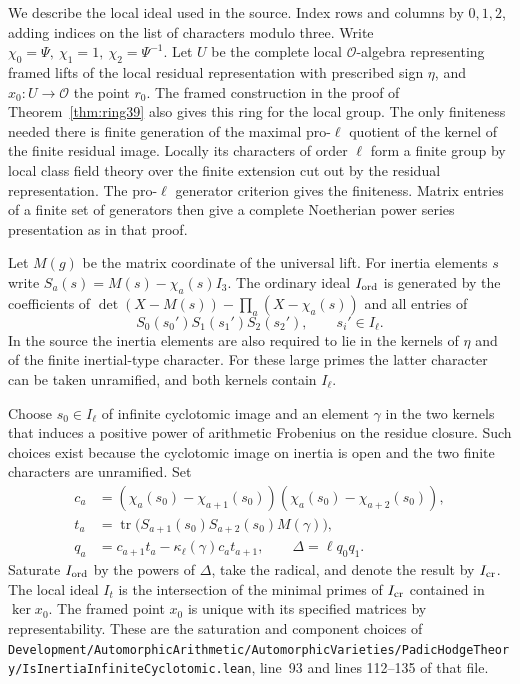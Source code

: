 \documentclass[a4paper,11pt]{article}
\theoremstyle{definition}
\theoremstyle{remark}
\newcommand{\srcloc}[2]{{\small\nolinkurl{#1.lean}}, line~#2}
\numberwithin{equation}{section}
\newcommand{\OO}{\mathcal O}
\begin{document}
We describe the local ideal used in the source. Index rows and columns
by \(0,1,2\), adding indices on the list of characters modulo three.
Write \(\chi_0=\Psi,\ \chi_1=1,\ \chi_2=\Psi^{-1}\).
Let \(U\) be the complete local \(\OO\)-algebra representing framed
lifts of the local residual representation with prescribed sign
\(\eta\), and \(x_0:U\to\OO\) the point \(r_0\).
The framed construction in the proof of Theorem~\ref{thm:ring39}
also gives this ring for the local group. The only finiteness
needed there is finite generation of the maximal pro-\(\ell\)
quotient of the kernel of the finite residual image. Locally its
characters of order \(\ell\) form a finite group by local class
field theory over the finite extension cut out by the residual
representation. The pro-\(\ell\) generator criterion gives the
finiteness. Matrix entries of a finite set of generators then
give a complete Noetherian power series presentation as in that proof.

Let \(M(g)\) be the matrix coordinate of the universal lift. For
inertia elements \(s\) write
\(S_a(s)=M(s)-\chi_a(s)I_3\). The ordinary ideal \(I_{\rm ord}\)
is generated by the coefficients of
\(\det(X-M(s))-\prod_a(X-\chi_a(s))\) and all entries of
\begin{equation}
       S_0(s_0')S_1(s_1')S_2(s_2'),\qquad s_i'\in I_\ell .
                                                        \label{eq:word68}
\end{equation}
In the source the inertia elements are also required to lie in the
kernels of \(\eta\) and of the finite inertial-type character.
For these large primes the latter character can be taken unramified,
and both kernels contain \(I_\ell\).

Choose \(s_0\in I_\ell\) of infinite cyclotomic image and an
element \(\gamma\) in the two kernels that induces a positive
power of arithmetic Frobenius on the residue closure. Such choices
exist because the cyclotomic image on inertia is open and the
two finite characters are unramified. Set
\begin{align*}
 c_a&=(\chi_a(s_0)-\chi_{a+1}(s_0))(\chi_a(s_0)-\chi_{a+2}(s_0)),\\
 t_a&=\operatorname{tr}\big(S_{a+1}(s_0)S_{a+2}(s_0)M(\gamma)\big),\\
 q_a&=c_{a+1}t_a-\kappa_\ell(\gamma)c_a t_{a+1},
                  \qquad \Delta=\ell q_0 q_1 .
\end{align*}
Saturate \(I_{\rm ord}\) by the powers of \(\Delta\), take the
radical, and denote the result by \(I_{\rm cr}\). The local
ideal \(I_t\) is the intersection of the minimal primes of
\(I_{\rm cr}\) contained in \(\ker x_0\). The framed point
\(x_0\) is unique with its specified matrices by representability.
These are the saturation and component choices of
\srcloc{Development/AutomorphicArithmetic/AutomorphicVarieties/PadicHodgeTheory/IsInertiaInfiniteCyclotomic}{93}
and lines 112--135 of that file.
\end{document}
